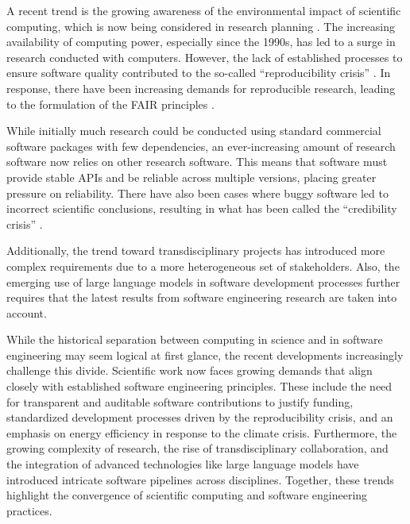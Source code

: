\documentclass[
        twocolumn,german,biblatex
    ]{article}
\begin{document}
    A recent trend is the growing awareness of the environmental impact
    of scientific computing, which is now being considered in research
    planning \autocite{lannelongue2023}. The increasing availability of
    computing power, especially since the 1990s, has led to a surge in
    research conducted with computers. However, the lack of established
    processes to ensure software quality contributed to the so-called
    ``reproducibility crisis'' \autocite{Pashler2012}. In response,
    there have been increasing demands for reproducible research,
    leading to the formulation of the FAIR principles
    \autocite{Hutton2016,Stagge2019,Stodden2018}.

    While initially much research could be conducted using standard
    commercial software packages with few dependencies, an
    ever-increasing amount of research software now relies on other
    research software. This means that software must provide stable APIs
    and be reliable across multiple versions, placing greater pressure
    on reliability. There have also been cases where buggy software led
    to incorrect scientific conclusions, resulting in what has been
    called the ``credibility crisis''
    \autocite{Miller2006Xray,Smart2018,Miller2016fMRI}.

    Additionally, the trend toward transdisciplinary projects has
    introduced more complex requirements due to a more heterogeneous set
    of stakeholders. Also, the emerging use of large language models in
    software development processes further requires that the latest
    results from software engineering research are taken into account.

    While the historical separation between computing in science and in
    software engineering may seem logical at first glance, the recent
    developments increasingly challenge this divide. Scientific work now
    faces growing demands that align closely with established software
    engineering principles. These include the need for transparent and
    auditable software contributions to justify funding, standardized
    development processes driven by the reproducibility crisis, and an
    emphasis on energy efficiency in response to the climate crisis.
    Furthermore, the growing complexity of research, the rise of
    transdisciplinary collaboration, and the integration of advanced
    technologies like large language models have introduced intricate
    software pipelines across disciplines. Together, these trends
    highlight the convergence of scientific computing and software
    engineering practices.
\end{document}
